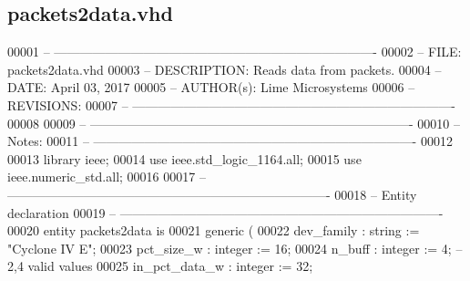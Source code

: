 \subsection{packets2data.\+vhd}
\label{packets2data_8vhd_source}

\begin{DoxyCode}
00001 \textcolor{keyword}{-- ---------------------------------------------------------------------------- }
00002 \textcolor{keyword}{-- FILE:    packets2data.vhd}
00003 \textcolor{keyword}{-- DESCRIPTION: Reads data from packets.}
00004 \textcolor{keyword}{-- DATE:    April 03, 2017}
00005 \textcolor{keyword}{-- AUTHOR(s):   Lime Microsystems}
00006 \textcolor{keyword}{-- REVISIONS:}
00007 \textcolor{keyword}{-- ---------------------------------------------------------------------------- }
00008 
00009 \textcolor{keyword}{-- ----------------------------------------------------------------------------}
00010 \textcolor{keyword}{-- Notes:}
00011 \textcolor{keyword}{-- ----------------------------------------------------------------------------}
00012 
00013 \textcolor{vhdlkeyword}{library }\textcolor{keywordflow}{ieee};
00014 \textcolor{vhdlkeyword}{use }ieee.std\_logic\_1164.\textcolor{keywordflow}{all};
00015 \textcolor{vhdlkeyword}{use }ieee.numeric\_std.\textcolor{keywordflow}{all};
00016 
00017 \textcolor{keyword}{-- ----------------------------------------------------------------------------}
00018 \textcolor{keyword}{-- Entity declaration}
00019 \textcolor{keyword}{-- ----------------------------------------------------------------------------}
00020 \textcolor{keywordflow}{entity }packets2data \textcolor{keywordflow}{is}
00021    \textcolor{keywordflow}{generic} \textcolor{vhdlchar}{(}
00022       \textcolor{vhdlchar}{dev_family}        \textcolor{vhdlchar}{:} \textcolor{comment}{string} \textcolor{vhdlchar}{:=} \textcolor{keyword}{"Cyclone IV E"};
00023       \textcolor{vhdlchar}{pct_size_w}        \textcolor{vhdlchar}{:} \textcolor{comment}{integer} \textcolor{vhdlchar}{:=} \textcolor{vhdllogic}{}\textcolor{vhdllogic}{16};
00024       \textcolor{vhdlchar}{n_buff}            \textcolor{vhdlchar}{:} \textcolor{comment}{integer} \textcolor{vhdlchar}{:=} \textcolor{vhdllogic}{}\textcolor{vhdllogic}{4};\textcolor{keyword}{ -- 2,4 valid values}
00025       \textcolor{vhdlchar}{in_pct_data_w}     \textcolor{vhdlchar}{:} \textcolor{comment}{integer} \textcolor{vhdlchar}{:=} \textcolor{vhdllogic}{}\textcolor{vhdllogic}{32};

\end{DoxyCode}
